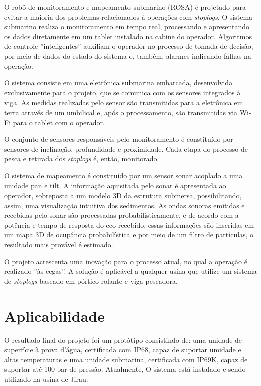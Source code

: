 O robô de monitoramento e mapeamento submarino (ROSA) é projetado para evitar a
maioria dos problemas relacionados à operações com \textit{stoplogs}. O sistema
submarino realiza o monitoramento em tempo real, processando e apresentando os
dados diretamente em um tablet instalado na cabine do operador. Algoritmos de
controle ''inteligentes'' auxiliam o operador no processo de tomada de decisão,
por meio de dados do estado do sistema e, também, alarmes indicando falhas na
operação.

O sistema consiste em uma eletrônica submarina embarcada, desenvolvida
exclusivamente para o projeto, que se comunica com os sensores integrados à
viga. As medidas realizadas pelo sensor são transmitidas para a
eletrônica em terra através de um umbilical e, após o processamento, são
transmitidas via Wi-Fi para o tablet com o operador.

O conjunto de sensores responsáveis pelo monitoramento é constituído por
sensores de inclinação, profundidade e proximidade. Cada etapa do processo de
pesca e retirada dos \textit{stoplogs} é, então, monitorado.

O sistema de mapeamento é constituído por um sensor sonar acoplado a uma unidade
pan e tilt. A informação aquisitada pelo sonar é apresentada ao operador,
sobreposta a um modelo 3D da estrutura submersa, possibilitando, assim, uma
visualização intuitiva dos sedimentos. As ondas sonoras emitidas e recebidas pelo sonar são
processadas probabilisticamente, e de acordo com a potência e tempo de resposta
do eco recebido, essas informações são inseridas em um mapa 3D de ocupância
probabilística e por meio de um filtro de partículas, o resultado mais provável
é estimado.

O projeto acrescenta uma inovação para o processo atual, no qual a operação é
realizado ''às cegas''. A solução é aplicável a qualquer usina que utilize um
sistema de \textit{stoplogs} baseado em pórtico rolante e viga-pescadora.


\section*{Aplicabilidade}

O resultado final do projeto foi um protótipo consistindo de: uma unidade de
superfície à prova d'água, certificada com IP68, capaz de suportar umidade e
altas temperaturas e uma unidade submarina, certificada com IP69K, capaz de
suportar até 100 bar de pressão. Atualmente, O sistema está instalado e sendo
utilizado na usina de Jirau.

